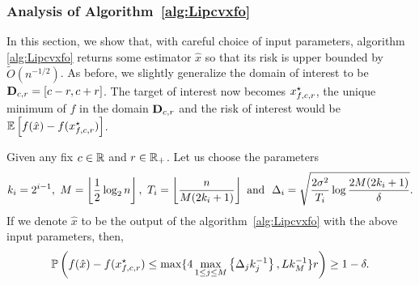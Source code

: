 \subsubsection{Analysis of Algorithm~\ref{alg:Lipcvxfo}}
In this section, we show that, with careful choice of input parameters, algorithm 
\ref{alg:Lipcvxfo} returns some estimator $\hat{x}$ so that its risk is upper bounded
by $\tilde{O}\left(n^{-1/2}\right)$. As before, we slightly generalize the domain of 
interest to be $\mathbf{D}_{c, r} = [c-r, c+r]$. The target of interest now becomes 
$x_{f, c, r}^\star$, the unique minimum of $f$ in the domain $\mathbf{D}_{c, r}$ and 
the risk of interest would be $\mathbb{E}\left[f(\hat{x}) - f(x_{f, c, r}^\star)\right]$.
\begin{proposition}
\label{proposition:first-order-nonsmooth-one-round-onedim}
Given any fix $c\in \mathbb{R}$ and $r\in \mathbb{R}_+$. Let us choose the parameters
\begin{equation}
\label{eqn:existence-of-first-order-nonsmooth-onedim}
k_i = 2^{i-1},~M = \left\lfloor{\frac{1}{2}\log_2 n}\right\rfloor,~T_i = \left\lfloor{\frac{n}{M(2k_i + 1)}}\right\rfloor~\text{and}~~
\Delta_i = \sqrt{\frac{2\sigma^2}{T_i}\log \frac{2M(2k_i +1)}{\delta}}.
\end{equation}
If we denote $\hat{x}$ to be the output of the algorithm~\ref{alg:Lipcvxfo}
with the above input parameters, then, 
\begin{equation*}
\mathbb{P} \left(f(\hat{x}) - f(x_{f, c, r}^\star) \leq \max\{4 \max_{1\leq j\leq M}\left\{\Delta_j k_j^{-1}\right\}, 
	Lk_M^{-1}\} r\right) \geq 1-\delta. 
\end{equation*}
\end{proposition}

